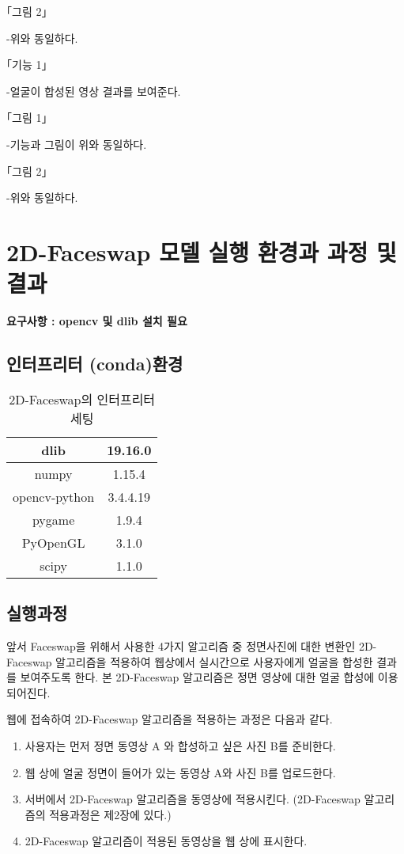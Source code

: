 ｢그림 2｣

-위와 동일하다.

\begin{figure}[h!]
\centering
\end{figure}
｢기능 1｣

-얼굴이 합성된 영상 결과를 보여준다.

｢그림 1｣

-기능과 그림이 위와 동일하다.

｢그림 2｣

-위와 동일하다.

\section{ 2D-Faceswap 모델 실행 환경과 과정 및 결과}

\textbf{요구사항 :  opencv 및 dlib 설치 필요}

\subsection{인터프리터 (conda)환경}

\begin{table}[h!]
\centering
\begin{tabular}{|c|c|}
    \hline\hline
    dlib & 19.16.0 \\ \hline
    numpy & 1.15.4 \\             \hline
    opencv-python & 3.4.4.19\\             \hline
    pygame & 1.9.4 \\            \hline
    PyOpenGL & 3.1.0 \\            \hline
    scipy  &  1.1.0\\
    \hline\hline
\end{tabular}
\caption{2D-Faceswap의 인터프리터 세팅  }
\end{table}

\subsection{실행과정} 

앞서 Faceswap을 위해서 사용한 4가지 알고리즘 중 정면사진에 대한 변환인 2D-Faceswap 알고리즘을 적용하여 웹상에서 실시간으로 사용자에게 얼굴을 합성한 결과를 보여주도록 한다. 본 2D-Faceswap 알고리즘은 정면 영상에 대한 얼굴 합성에 이용되어진다. 

웹에 접속하여 2D-Faceswap 알고리즘을 적용하는 과정은 다음과 같다. 
\begin{enumerate}
    \item  사용자는 먼저 정면 동영상 A 와 합성하고 싶은 사진 B를 준비한다.
    \item 웹 상에 얼굴 정면이 들어가 있는 동영상 A와 사진 B를 업로드한다.
    \item 서버에서 2D-Faceswap 알고리즘을 동영상에 적용시킨다. (2D-Faceswap 알고리즘의 적용과정은 제2장에 있다.)
    \item 2D-Faceswap 알고리즘이 적용된 동영상을 웹 상에 표시한다.
\end{enumerate}

